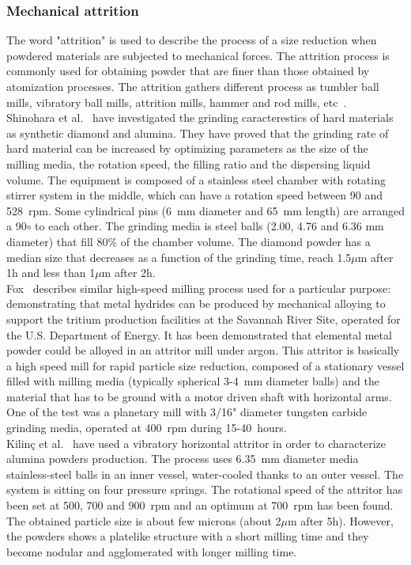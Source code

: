 \documentclass[../main]{subfiles}
\begin{document}
\subsubsection{Mechanical attrition}

The word "attrition" is used to describe the process of a size reduction when powdered materials are subjected to mechanical forces. The attrition process is commonly used for obtaining powder that are finer than those obtained by atomization processes. The attrition gathers different process as tumbler ball mills, vibratory ball mills, attrition mills, hammer and rod mills, etc~\cite{Kilinc2004InvestigationMilling}.\\
Shinohara et al.~\cite{Shinohara1999FinegrindingCharacteristics} have investigated the grinding caracterestics of hard materials as synthetic diamond and alumina. They have proved that the grinding rate of hard material can be increased by optimizing parameters as the size of the milling media, the rotation speed, the filling ratio and the dispersing liquid volume. The equipment is composed of a stainless steel chamber with rotating  stirrer system in the middle, which can have a rotation speed between 90 and 528~rpm. Some cylindrical pins  (6~mm diameter and 65~mm length) are arranged  a 90$\circ$ to each other. The grinding media is steel balls (2.00, 4.76 and 6.36 mm diameter) that fill 80\% of the chamber volume. The diamond powder has a median size that decreases as a function of the grinding time, reach 1.5$\mu$m after 1h and less than 1$\mu$m after 2h.\\
Fox~\cite{Fox2006SynthesisMetal} describes similar high-speed milling process used for a particular purpose: demonstrating that metal hydrides can be produced by mechanical alloying to support the tritium production facilities at the Savannah River Site, operated for the U.S. Department of Energy. It has been demonstrated that elemental metal powder could be alloyed in an attritor mill under argon. This attritor is basically a high speed mill for rapid particle size reduction, composed of a stationary vessel filled with milling media (typically spherical 3-4~mm diameter balls) and the material that has to be ground with a motor driven shaft with horizontal arms. One of the test was a planetary mill with 3/16" diameter tungsten carbide grinding media, operated at 400~rpm during 15-40~hours.\\
Kilinç et al.~\cite{Kilinc2004InvestigationMilling} have used a vibratory horizontal attritor in order to characterize alumina powders production. The process uses 6.35~mm diameter media stainless-steel balls in an inner vessel, water-cooled thanks to an outer vessel. The system is sitting on four pressure springs. The rotational speed of the attritor has been set at 500, 700 and 900~rpm and an optimum at 700~rpm has been found. The obtained particle size is about few microns (about 2$\mu$m after 5h). However, the powders shows a platelike structure with a short milling time and they become nodular and agglomerated with longer milling time.
\end{document}
